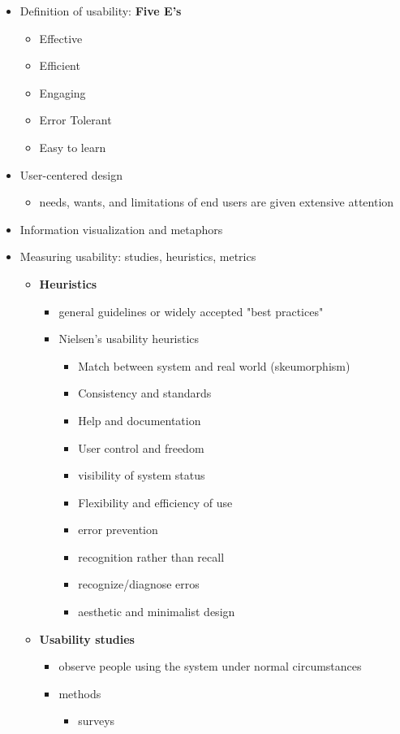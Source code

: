 \documentclass[11pt]{article}
\begin{document}
\begin{itemize}
\item Definition of usability: \textbf{Five E's}
\begin{itemize}
\item Effective
\item Efficient
\item Engaging
\item Error Tolerant
\item Easy to learn
\end{itemize}
\item User-centered design
\begin{itemize}
\item needs, wants, and limitations of end users are given extensive attention
\end{itemize}
\item Information visualization and metaphors
\item Measuring usability: studies, heuristics, metrics
\begin{itemize}
\item \textbf{Heuristics}
\begin{itemize}
\item general guidelines or widely accepted "best practices"
\item Nielsen's usability heuristics
\begin{itemize}
\item Match between system and real world (skeumorphism)
\item Consistency and standards
\item Help and documentation
\item User control and freedom
\item visibility of system status
\item Flexibility and efficiency of use
\item error prevention
\item recognition rather than recall
\item recognize/diagnose erros
\item aesthetic and minimalist design
\end{itemize}
\end{itemize}
\item \textbf{Usability studies}
\begin{itemize}
\item observe people using the system under normal circumstances
\item methods
\begin{itemize}
\item surveys

\end{itemize}
\end{itemize}
\end{itemize}
\end{itemize}
\end{document}
